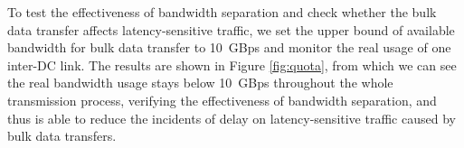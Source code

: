 To test the effectiveness of bandwidth separation and check whether the bulk data transfer affects latency-sensitive traffic, we set the upper bound of available bandwidth for bulk data transfer to 10~GBps and monitor the real usage of one inter-DC link. The results are shown in Figure \ref{fig:quota}, from which we can see the real bandwidth usage stays below 10~GBps throughout the whole transmission process, verifying the effectiveness of bandwidth separation, and thus \name is able to reduce the incidents of delay on latency-sensitive traffic caused by bulk data transfers.

\begin{table}[t]
\begin{center}
\end{center}
\label{table:usage}
\vspace{-0.4cm}
\end{table}

